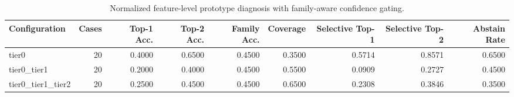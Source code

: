 \begin{table}[t]
\centering
\caption{Normalized feature-level prototype diagnosis with family-aware confidence gating.}
\label{tab:dice_stressor_hierarchical_diagnosis}
\footnotesize
\begin{tabular}{lrrrrrrrr}
\toprule
Configuration & Cases & Top-1 Acc. & Top-2 Acc. & Family Acc. & Coverage & Selective Top-1 & Selective Top-2 & Abstain Rate \\
\midrule
tier0 & 20 & 0.4000 & 0.6500 & 0.4500 & 0.3500 & 0.5714 & 0.8571 & 0.6500 \\
tier0_tier1 & 20 & 0.2000 & 0.4000 & 0.4500 & 0.5500 & 0.0909 & 0.2727 & 0.4500 \\
tier0_tier1_tier2 & 20 & 0.2500 & 0.4500 & 0.4500 & 0.6500 & 0.2308 & 0.3846 & 0.3500 \\
\bottomrule
\end{tabular}

\end{table}
